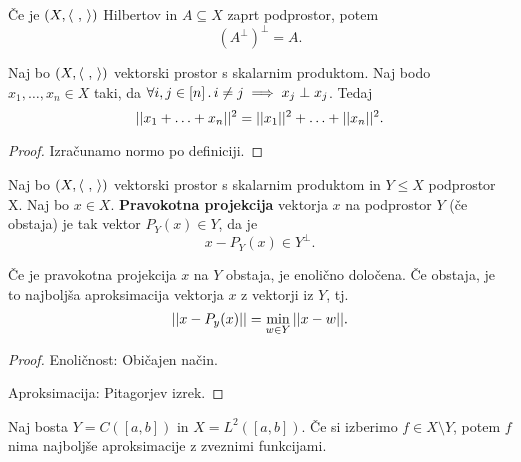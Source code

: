 \begin{opomba}
    Če je \((X, \left\langle \ , \,  \right\rangle)\) Hilbertov in \(A \subseteq X\) zaprt podprostor, potem \[(A^\perp)^\perp = A.\]
\end{opomba}

\begin{trditev}
    Naj bo \((X, \left\langle \ , \,  \right\rangle)\) vektorski prostor s skalarnim produktom. Naj bodo \(x_1, \ldots, x_n \in X\) taki, da \(\forall i, j \in [n] \,.\, i \neq j \implies x_j \perp x_j\). Tedaj 
    \[||x_1 + \ldots + x_n||^2 = ||x_1||^2 + \ldots + ||x_n||^2.\]
\end{trditev}

\begin{proof}
    Izračunamo normo po definiciji.
\end{proof}

\newpage
\begin{definicija}
    Naj bo \((X, \left\langle \ , \,  \right\rangle)\) vektorski prostor s skalarnim produktom in \(Y \leq X\) podprostor X. Naj bo \(x \in X\). \textbf{Pravokotna projekcija} vektorja \(x\) na podprostor \(Y\) (če obstaja) je tak vektor \(P_Y(x) \in Y\), da je 
    \[x - P_Y(x) \in Y^\perp.\]
\end{definicija}

\begin{trditev}
    Če je pravokotna projekcija \(x\) na \(Y\) obstaja, je enolično določena. Če obstaja, je to najboljša aproksimacija vektorja \(x\) z vektorji iz \(Y\), tj.
    \[||x - P_y(x)|| = \min_{w \in Y} ||x - w||.\]
\end{trditev}

\begin{proof}
    Enoličnost: Običajen način.

    Aproksimacija: Pitagorjev izrek.
\end{proof}

\begin{zgled}
    Naj bosta \(Y = C([a,b])\) in \(X = L^2([a, b])\). Če si izberimo \(f \in X \setminus Y\), potem \(f\) nima najboljše aproksimacije z zveznimi funkcijami.
\end{zgled}

